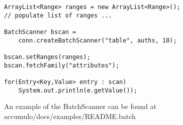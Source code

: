 \small
\begin{verbatim}
ArrayList<Range> ranges = new ArrayList<Range>();
// populate list of ranges ...

BatchScanner bscan =
    conn.createBatchScanner("table", auths, 10);

bscan.setRanges(ranges);
bscan.fetchFamily("attributes");

for(Entry<Key,Value> entry : scan)
    System.out.println(e.getValue());
\end{verbatim}
\normalsize

An example of the BatchScanner can be found at\\
accumulo/docs/examples/README.batch

